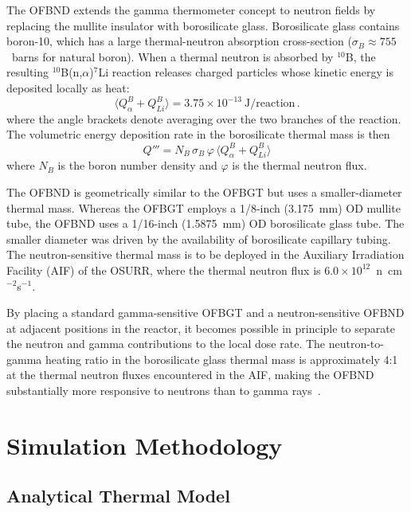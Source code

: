 The OFBND extends the gamma thermometer concept to neutron fields by replacing the mullite insulator with borosilicate glass.  Borosilicate glass contains boron-10, which has a large thermal-neutron absorption cross-section ($\sigma_B \approx 755$~barns for natural boron).  When a thermal neutron is absorbed by $^{10}$B, the resulting $^{10}$B(n,$\alpha$)$^{7}$Li reaction releases charged particles whose kinetic energy is deposited locally as heat:
\begin{equation}
    \langle Q_\alpha^B + Q_{Li}^B \rangle = 3.75 \times 10^{-13}~\text{J/reaction} \, .
    \label{eq:boron_Q}
\end{equation}
where the angle brackets denote averaging over the two branches of the reaction.  The volumetric energy deposition rate in the borosilicate thermal mass is then
\begin{equation}
    Q''' = N_B \, \sigma_B \, \varphi \, \langle Q_\alpha^B + Q_{Li}^B \rangle
    \label{eq:Qppp_neutron}
\end{equation}
where $N_B$ is the boron number density and $\varphi$ is the thermal neutron flux.

The OFBND is geometrically similar to the OFBGT but uses a smaller-diameter thermal mass.  Whereas the OFBGT employs a 1/8-inch (3.175~mm) OD mullite tube, the OFBND uses a 1/16-inch (1.5875~mm) OD borosilicate glass tube.  The smaller diameter was driven by the availability of borosilicate capillary tubing.  The neutron-sensitive thermal mass is to be deployed in the Auxiliary Irradiation Facility (AIF) of the OSURR, where the thermal neutron flux is $6.0 \times 10^{12}$~n~cm$^{-2}$s$^{-1}$.

By placing a standard gamma-sensitive OFBGT and a neutron-sensitive OFBND at adjacent positions in the reactor, it becomes possible in principle to separate the neutron and gamma contributions to the local dose rate.  The neutron-to-gamma heating ratio in the borosilicate glass thermal mass is approximately 4:1 at the thermal neutron fluxes encountered in the AIF, making the OFBND substantially more responsive to neutrons than to gamma rays~\cite{SimReport2023}.

\section{Simulation Methodology}
\label{sec:simulation_methodology}

\subsection{Analytical Thermal Model}

